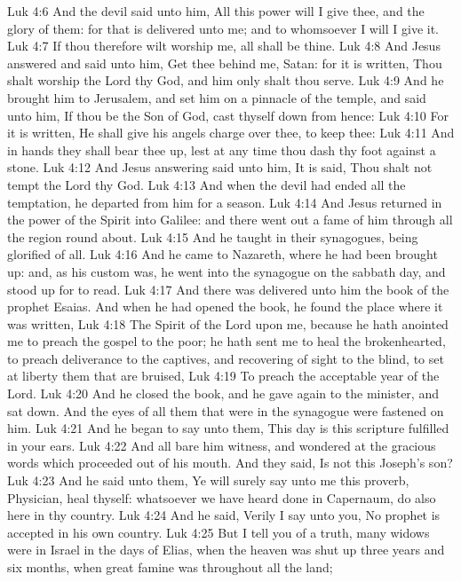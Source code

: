 \vs Luk 4:6 And the devil said unto him, All this power will I give thee, and the glory of them: for that is delivered unto me; and to whomsoever I will I give it.
\vs Luk 4:7 If thou therefore wilt worship me, all shall be thine.
\vs Luk 4:8 And Jesus answered and said unto him, Get thee behind me, Satan: for it is written, Thou shalt worship the Lord thy God, and him only shalt thou serve.
\vs Luk 4:9 And he brought him to Jerusalem, and set him on a pinnacle of the temple, and said unto him, If thou be the Son of God, cast thyself down from hence:
\vs Luk 4:10 For it is written, He shall give his angels charge over thee, to keep thee:
\vs Luk 4:11 And in  hands they shall bear thee up, lest at any time thou dash thy foot against a stone.
\vs Luk 4:12 And Jesus answering said unto him, It is said, Thou shalt not tempt the Lord thy God.
\vs Luk 4:13 And when the devil had ended all the temptation, he departed from him for a season.
\vs Luk 4:14 And Jesus returned in the power of the Spirit into Galilee: and there went out a fame of him through all the region round about.
\vs Luk 4:15 And he taught in their synagogues, being glorified of all.
\vs Luk 4:16 And he came to Nazareth, where he had been brought up: and, as his custom was, he went into the synagogue on the sabbath day, and stood up for to read.
\vs Luk 4:17 And there was delivered unto him the book of the prophet Esaias. And when he had opened the book, he found the place where it was written,
\vs Luk 4:18 The Spirit of the Lord  upon me, because he hath anointed me to preach the gospel to the poor; he hath sent me to heal the brokenhearted, to preach deliverance to the captives, and recovering of sight to the blind, to set at liberty them that are bruised,
\vs Luk 4:19 To preach the acceptable year of the Lord.
\vs Luk 4:20 And he closed the book, and he gave  again to the minister, and sat down. And the eyes of all them that were in the synagogue were fastened on him.
\vs Luk 4:21 And he began to say unto them, This day is this scripture fulfilled in your ears.
\vs Luk 4:22 And all bare him witness, and wondered at the gracious words which proceeded out of his mouth. And they said, Is not this Joseph's son?
\vs Luk 4:23 And he said unto them, Ye will surely say unto me this proverb, Physician, heal thyself: whatsoever we have heard done in Capernaum, do also here in thy country.
\vs Luk 4:24 And he said, Verily I say unto you, No prophet is accepted in his own country.
\vs Luk 4:25 But I tell you of a truth, many widows were in Israel in the days of Elias, when the heaven was shut up three years and six months, when great famine was throughout all the land;
